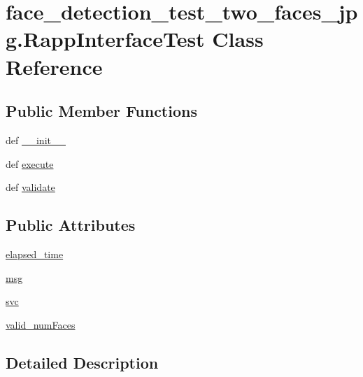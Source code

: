 \hypertarget{classface__detection__test__two__faces__jpg_1_1RappInterfaceTest}{\section{face\-\_\-detection\-\_\-test\-\_\-two\-\_\-faces\-\_\-jpg.\-Rapp\-Interface\-Test Class Reference}
\label{classface__detection__test__two__faces__jpg_1_1RappInterfaceTest}
}
\subsection*{Public Member Functions}
\begin{DoxyCompactItemize}
\item 
def \hyperlink{classface__detection__test__two__faces__jpg_1_1RappInterfaceTest_a7f632975ee0ea5949603bd8603a5ce79}{\-\_\-\-\_\-init\-\_\-\-\_\-}
\item 
def \hyperlink{classface__detection__test__two__faces__jpg_1_1RappInterfaceTest_a18cf01421c002f645c8b9bb4d9d838be}{execute}
\item 
def \hyperlink{classface__detection__test__two__faces__jpg_1_1RappInterfaceTest_a336b3c19d540e81f4108baf870f32ac5}{validate}
\end{DoxyCompactItemize}
\subsection*{Public Attributes}
\begin{DoxyCompactItemize}
\item 
\hyperlink{classface__detection__test__two__faces__jpg_1_1RappInterfaceTest_af879b0ade674333058cc0bf0ce22f5dc}{elapsed\-\_\-time}
\item 
\hyperlink{classface__detection__test__two__faces__jpg_1_1RappInterfaceTest_af3cb88f8c0bf2b382b39866f4890fee5}{msg}
\item 
\hyperlink{classface__detection__test__two__faces__jpg_1_1RappInterfaceTest_a594a042e9219962dcc34a62b8f0636b3}{svc}
\item 
\hyperlink{classface__detection__test__two__faces__jpg_1_1RappInterfaceTest_a4c7c23ce6f8de9ac9da2e75b89f83a02}{valid\-\_\-num\-Faces}
\end{DoxyCompactItemize}


\subsection{Detailed Description}


